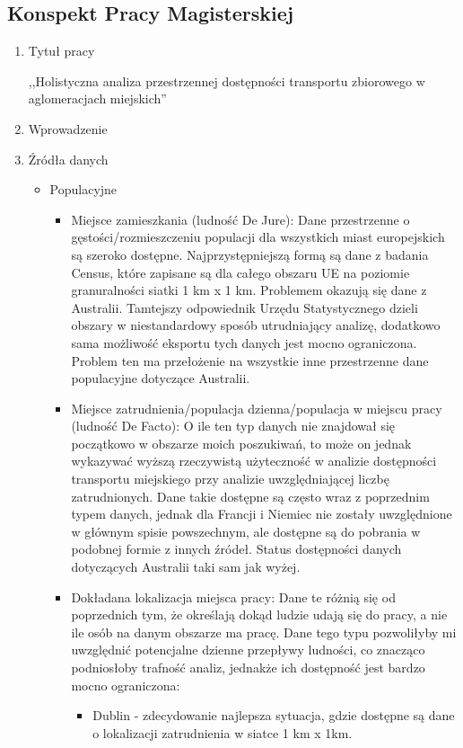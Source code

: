\documentclass[12pt]{article}
\begin{document}
\subsection*{Konspekt Pracy Magisterskiej}
\begin{enumerate}
    \item Tytuł pracy
    
    ,,Holistyczna analiza przestrzennej dostępności transportu zbiorowego w aglomeracjach miejskich''
    \item Wprowadzenie
    \item Źródła danych
        \begin{itemize}
        \item Populacyjne
            \begin{itemize}
                \item Miejsce zamieszkania (ludność De Jure): Dane przestrzenne o gęstości/rozmieszczeniu populacji dla wszystkich miast europejskich są szeroko dostępne. Najprzystępniejszą formą są dane z badania Census, które zapisane są dla całego obszaru UE na poziomie granuralności siatki 1 km x 1 km. Problemem okazują się dane z Australii. Tamtejszy odpowiednik Urzędu Statystycznego dzieli obszary w niestandardowy sposób utrudniający analizę, dodatkowo sama możliwość eksportu tych danych jest mocno ograniczona. Problem ten ma przełożenie na wszystkie inne przestrzenne dane populacyjne dotyczące Australii.
                \item Miejsce zatrudnienia/populacja dzienna/populacja w miejscu pracy (ludność De Facto): O ile ten typ danych nie znajdował się początkowo w obszarze moich poszukiwań, to może on jednak wykazywać wyższą rzeczywistą użyteczność w analizie dostępności transportu miejskiego przy analizie uwzględniającej liczbę zatrudnionych. Dane takie dostępne są często wraz z poprzednim typem danych, jednak dla Francji i Niemiec nie zostały uwzględnione w głównym spisie powszechnym, ale dostępne są do pobrania w podobnej formie z innych źródeł. Status dostępności danych dotyczących Australii taki sam jak wyżej.
                \item Dokładana lokalizacja miejsca pracy: Dane te różnią się od poprzednich tym, że określają dokąd ludzie udają się do pracy, a nie ile osób na danym obszarze ma pracę. Dane tego typu pozwoliłyby mi uwzględnić potencjalne dzienne przepływy ludności, co znacząco podniosłoby trafność analiz, jednakże ich dostępność jest bardzo mocno ograniczona:
                \begin{itemize}
                    \item Dublin - zdecydowanie najlepsza sytuacja, gdzie dostępne są dane o lokalizacji zatrudnienia w siatce 1 km x 1km.

\end{itemize}
\end{itemize}
\end{itemize}
\end{enumerate}
\end{document}

